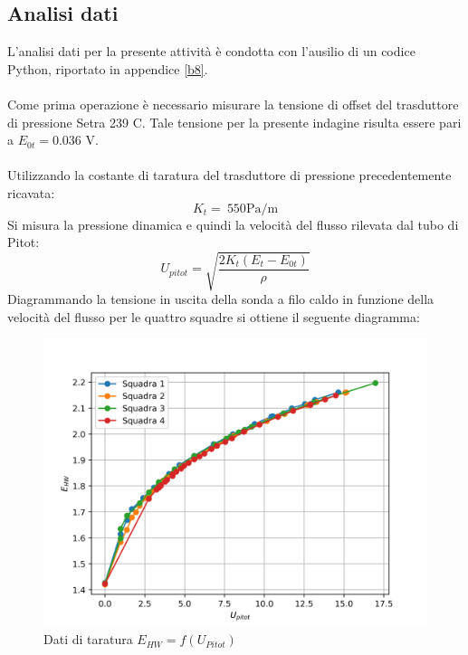 \subsection{Analisi dati}
L'analisi dati per la presente attività è condotta con l'ausilio di un codice Python, riportato in appendice \ref{b8}.\\\\
Come prima operazione è necessario misurare la tensione di offset del trasduttore di pressione Setra 239 C. Tale tensione per la presente indagine risulta essere pari a $E_{0t}=0.036$ V.\\\\
Utilizzando la costante di taratura del trasduttore di pressione precedentemente ricavata:
\begin{equation*}
    K_t =\ 550 \text{Pa/m}
\end{equation*}
Si misura la pressione dinamica e quindi la velocità del flusso rilevata dal tubo di Pitot:
\begin{equation*}
    U_{pitot} = \sqrt{\frac{2K_t(E_{t}-E_{0t})}\rho}
\end{equation*}
Diagrammando la tensione in uscita della sonda a filo caldo in funzione della velocità del flusso per le quattro squadre si ottiene il seguente diagramma:
\begin{figure}[H]
    \centering
    \includegraphics[width=.8\textwidth]{images/8/rawdata.png}
    \caption{Dati di taratura $E_{HW}=f(U_{Pitot})$}
\end{figure}

